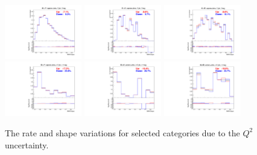 \begin{description}
\begin{figure}[hbtp]
 \begin{center}
   \includegraphics[width=0.3\textwidth]{Figures/Analysis_1_Diagrams/Q2Plot_ttbar_CFMlpANN_ljets_j5_t3_Q2scale_ttH_ttbar}
   \includegraphics[width=0.3\textwidth]{Figures/Analysis_1_Diagrams/Q2Plot_ttbarPlusCCbar_CFMlpANN_ljets_j5_t3_Q2scale_ttH_ttbar_cc}
   \includegraphics[width=0.3\textwidth]{Figures/Analysis_1_Diagrams/Q2Plot_ttbarPlusBBbar_CFMlpANN_ljets_j5_t3_Q2scale_ttH_ttbar_bb}
   \includegraphics[width=0.3\textwidth]{Figures/Analysis_1_Diagrams/Q2Plot_ttbar_CFMlpANN_ljets_jge6_tge4_Q2scale_ttH_ttbar}
   \includegraphics[width=0.3\textwidth]{Figures/Analysis_1_Diagrams/Q2Plot_ttbarPlusCCbar_CFMlpANN_ljets_jge6_tge4_Q2scale_ttH_ttbar_cc}
   \includegraphics[width=0.3\textwidth]{Figures/Analysis_1_Diagrams/Q2Plot_ttbarPlusBBbar_CFMlpANN_ljets_jge6_tge4_Q2scale_ttH_ttbar_bb}
   \caption{The rate and shape variations for selected categories due to the $Q^2$ uncertainty.}
   \label{fig:Q2plots}
 \end{center}
\end{figure}


\end{description}
